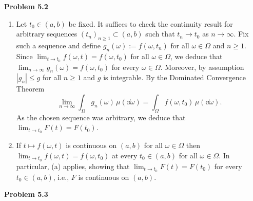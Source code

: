 
\textbf{Problem 5.2}
\begin{enumerate}[label={(\alph*)}]
	\item Let $t_0\in (a,b)$ be fixed. It suffices to check the continuity result for arbitrary sequences $(t_n)_{n\ge 1} \subset (a, b)$ such that $t_n\to t_0$ as $n\to\infty$. Fix such a sequence and define $g_n(\omega):= f(\omega,t_n)$ for all $\omega\in\Omega$ and $n\ge 1$. Since $\lim_{t\to t_0}f(\omega,t)=f(\omega,t_0)$ for all $\omega\in\Omega$, we deduce that $\lim_{n\to\infty} g_n(\omega) = f(\omega,t_0)$ for every $\omega\in\Omega$. Moreover, by assumption $|g_n| \le g$ for all $n \ge 1$ and $g$ is integrable. By the Dominated Convergence Theorem
\[
	\lim_{n\to\infty} \int_\Omega g_n(\omega)\,\mu(\dd\omega) = \int_\Omega f(\omega,t_0)\,\mu(\dd\omega).
\]
As the chosen sequence was arbitrary, we deduce that $\lim_{t\to t_0} F(t) = F(t_0)$.

	\item If $t\mapsto f(\omega,t)$ is continuous on $(a, b)$ for all $\omega\in\Omega$ then $\lim_{t\to t_0}f(\omega,t)=f(\omega,t_0)$ at every $t_0\in(a,b)$ for all $\omega\in\Omega$. In particular, (a) applies, showing that $\lim_{t\to t_0} F(t) = F(t_0)$ for every $t_0\in (a,b)$, i.e., $F$ is continuous on $(a, b)$.
\end{enumerate}
 

\bigskip
\textbf{Problem 5.3}

